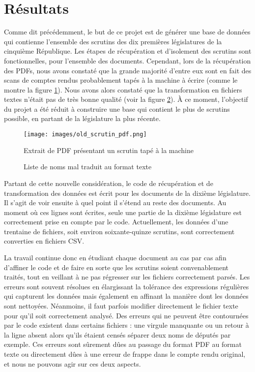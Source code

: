 \section{Résultats}

Comme dit précédemment, le but de ce projet est de générer une base de données qui contienne l'ensemble des scrutins des dix premières législatures de la cinquième République. Les étapes de récupération et d'isolement des scrutins sont fonctionnelles, pour l'ensemble des documents. Cependant, lors de la récupération des PDFs, nous avons constaté que la grande majorité d'entre eux sont en fait des scans de comptes rendus probablement tapés à la machine à écrire (comme le montre la figure \ref{old_scrutin_pdf}). Nous avons alors constaté que la transformation en fichiers textes n'était pas de très bonne qualité (voir la figure \ref{liste_noms_pourris}). À ce moment, l'objectif du projet a été réduit à construire une base qui contient le plus de scrutins possible, en partant de la législature la plus récente.

\begin{figure}[!h]
\begin{center}
\texttt{[image: images/old\_scrutin\_pdf.png]}
\caption{Extrait de PDF présentant un scrutin tapé à la machine}
\label{old_scrutin_pdf}
\end{center}
\end{figure}

\newpage

\begin{figure}
\caption{Liste de noms mal traduit au format texte}
\label{liste_noms_pourris}
\end{figure}

Partant de cette nouvelle considération, le code de récupération et de transformation des données est écrit pour les documents de la dixième législature. Il s'agit de voir ensuite à quel point il s'étend au reste des documents. Au moment où ces lignes sont écrites, seule une partie de la dixième législature est correctement prise en compte par le code. Actuellement, les données d'une trentaine de fichiers, soit environ soixante-quinze scrutins, sont correctement converties en fichiers CSV.

La travail continue donc en étudiant chaque document au cas par cas afin d'affiner le code et de faire en sorte que les scrutins soient convenablement traités, tout en veillant à ne pas régresser sur les fichiers correctement parsés. Les erreurs sont souvent résolues en élargissant la tolérance des expressions régulières qui capturent les données mais également en affinant la manière dont les données sont nettoyées. Néanmoins, il faut parfois modifier directement le fichier texte pour qu'il soit correctement analysé. Des erreurs qui ne peuvent être contournées par le code existent dans certains fichiers : une virgule manquante ou un retour à la ligne absent alors qu'ils étaient censés séparer deux noms de députés par exemple. Ces erreurs sont sûrement dûes au passage du format PDF au format texte ou directement dûes à une erreur de frappe dans le compte rendu original, et nous ne pouvons agir sur ces deux aspects.

